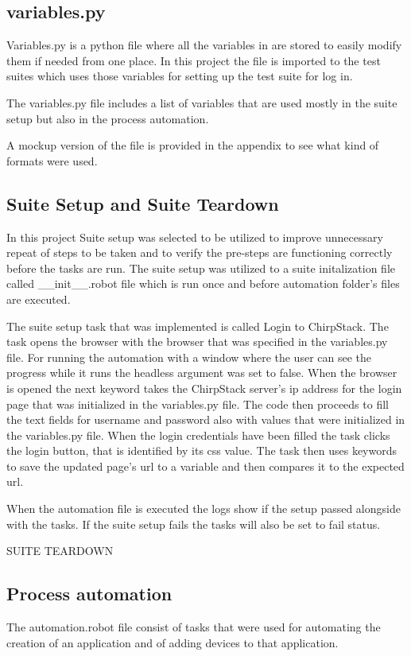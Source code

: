 \subsection{variables.py}
Variables.py is a python file where all the variables in are stored to easily modify them if needed from one place.
In this project the file is imported to the test suites which uses those variables for setting up the test suite for log in.

The variables.py file includes a list of variables that are used mostly in the suite setup but also in the process automation.

A mockup version of the file is provided in the appendix to see what kind of formats were used.

\subsection{Suite Setup and Suite Teardown}
In this project Suite setup was selected to be utilized to improve unnecessary repeat of steps to be taken and to verify the pre-steps are functioning correctly before the tasks are run.
The suite setup was utilized to a suite initalization file called \_\_init\_\_.robot file which is run once and before automation folder's files are executed.

The suite setup task that was implemented is called Login to ChirpStack.
The task opens the browser with the browser that was specified in the variables.py file.
For running the automation with a window where the user can see the progress while it runs the headless argument was set to false.
When the browser is opened the next keyword takes the ChirpStack server's \gls{ip} address for the login page that was initialized in the variables.py file.
The code then proceeds to fill the text fields for username and password also with values that were initialized in the variables.py file.
When the login credentials have been filled the task clicks the login button, that is identified by its css value.
The task then uses keywords to save the updated page's \gls{url} to a variable and then compares it to the expected \gls{url}.

When the automation file is executed the logs show if the setup passed alongside with the tasks.
If the suite setup fails the tasks will also be set to fail status.

SUITE TEARDOWN

\subsection{Process automation}
The automation.robot file consist of tasks that were used for automating the creation of an application and of adding devices to that application.

